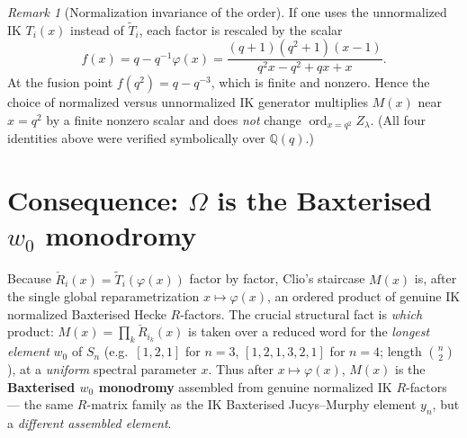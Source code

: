 \documentclass{article}
\theoremstyle{remark}
\newtheorem{remark}{Remark}
\newcommand{\Rcheck}{\check{R}}
\newcommand{\Ttilde}{\widetilde{T}}
\newcommand{\ord}{\operatorname{ord}}
\begin{document}
\begin{remark}[Normalization invariance of the order]
If one uses the unnormalized IK $T_i(x)$ instead of $\Ttilde_i$, each factor is rescaled by the scalar
\[
f(x) = q - q^{-1} \varphi(x) = \frac{(q+1)(q^2+1)(x-1)}{q^2 x - q^2 + q x + x}.
\]
At the fusion point $f(q^2) = q - q^{-3}$, which is finite and nonzero. Hence the choice of normalized versus unnormalized IK generator multiplies $M(x)$ near $x = q^2$ by a finite nonzero scalar and does \emph{not} change $\ord_{x=q^2} Z_\lambda$. (All four identities above were verified symbolically over $\mathbb{Q}(q)$.)
\end{remark}

\section{Consequence: $\Omega$ is the Baxterised $w_0$ monodromy}

Because $\Rcheck_i(x) = \Ttilde_i(\varphi(x))$ factor by factor, Clio's staircase $M(x)$ is, after the single global reparametrization $x \mapsto \varphi(x)$, an ordered product of genuine IK normalized Baxterised Hecke $R$-factors. The crucial structural fact is \emph{which} product: $M(x) = \prod_k \Rcheck_{i_k}(x)$ is taken over a reduced word for the \emph{longest element} $w_0$ of $S_n$ (e.g.\ $[1,2,1]$ for $n=3$, $[1,2,1,3,2,1]$ for $n=4$; length $\binom{n}{2}$), at a \emph{uniform} spectral parameter $x$. Thus after $x \mapsto \varphi(x)$, $M(x)$ is the \textbf{Baxterised $w_0$ monodromy} assembled from genuine normalized IK $R$-factors --- the same $R$-matrix family as the IK Baxterised Jucys--Murphy element $y_n$, but a \emph{different assembled element}.
\end{document}

